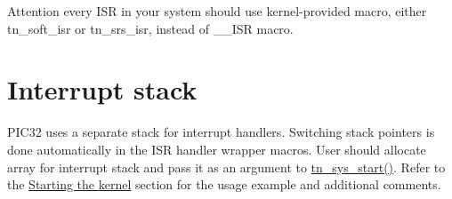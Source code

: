 \begin{DoxyAttention}{Attention}
every I\+S\+R in your system should use kernel-\/provided macro, either {\ttfamily tn\+\_\+soft\+\_\+isr} or {\ttfamily tn\+\_\+srs\+\_\+isr}, instead of {\ttfamily \+\_\+\+\_\+\+I\+S\+R} macro.
\end{DoxyAttention}
\hypertarget{pic32_details_pic32_interrupt_stack}{}\section{Interrupt stack}\label{pic32_details_pic32_interrupt_stack}
P\+I\+C32 uses a separate stack for interrupt handlers. Switching stack pointers is done automatically in the I\+S\+R handler wrapper macros. User should allocate array for interrupt stack and pass it as an argument to {\ttfamily \hyperlink{tn__sys_8h_a62ab25d9d8ca01c02d368968f19e49bf}{tn\+\_\+sys\+\_\+start()}}. Refer to the \hyperlink{quick_guide_starting_the_kernel}{Starting the kernel} section for the usage example and additional comments. 